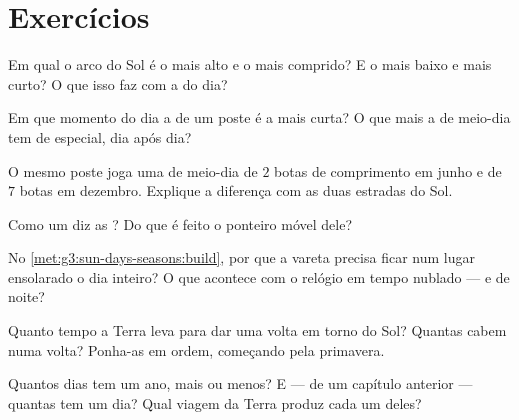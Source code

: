 \section{Exercícios}

\begin{exercise}[$\star$]\label{exo:g3:sun-days-seasons:1}
Em qual  o arco do Sol é o mais alto e o mais comprido? E o
mais baixo e mais curto? O que isso faz com a  do dia?
\end{exercise}

\begin{exercise}[$\star$]\label{exo:g3:sun-days-seasons:2}
Em que momento do dia a  de um poste é a mais curta? O que mais
a  de meio-dia tem de especial, dia após dia?
\end{exercise}

\begin{exercise}[$\star$]\label{exo:g3:sun-days-seasons:3}
O mesmo poste joga uma  de meio-dia de $2$ botas de comprimento
em junho e de $7$ botas em dezembro. Explique a diferença com as duas
estradas do Sol.
\end{exercise}

\begin{exercise}[$\star$]\label{exo:g3:sun-days-seasons:4}
Como um  diz as ? Do que é feito o ponteiro móvel
dele?
\end{exercise}

\begin{exercise}[$\star$]\label{exo:g3:sun-days-seasons:5}
No \cref{met:g3:sun-days-seasons:build}, por que a vareta precisa
ficar num lugar ensolarado o dia inteiro? O que acontece com o
relógio em tempo nublado --- e de noite?
\end{exercise}

\begin{exercise}[$\star$]\label{exo:g3:sun-days-seasons:6}
Quanto tempo a Terra leva para dar uma volta em torno do Sol? Quantas
 cabem numa volta? Ponha-as em ordem, começando pela
primavera.
\end{exercise}

\begin{exercise}[$\star$]\label{exo:g3:sun-days-seasons:7}
Quantos dias tem um ano, mais ou menos? E --- de um capítulo anterior
--- quantas  tem um dia? Qual viagem da Terra produz cada um
deles?
\end{exercise}

